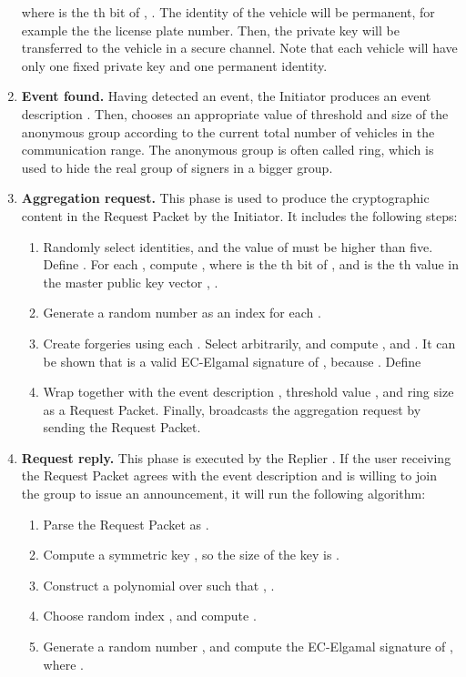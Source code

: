 \documentclass[a4paper]{article}
\begin{document}
\begin{enumerate}
     where  is the th bit of , . The identity of the vehicle will be permanent, for example the the license plate number. Then, the private key will be transferred to the vehicle in a secure channel. Note that each vehicle will have only one fixed private key and one permanent identity.
 \item \textbf{Event found.} Having detected an event, the Initiator  produces an event description . Then,  chooses an appropriate value of threshold  and size of the anonymous group  according to the current total number of vehicles in the communication range. The anonymous group is often called ring, which is used to hide the real group of signers in a bigger group.
 \item \textbf{Aggregation request.} This phase is used to produce the cryptographic content in the Request Packet by the Initiator. It includes the following steps:
        \begin{enumerate}
        \item Randomly select  identities, and the value of  must be higher than five. Define . For each , compute , where  is the th bit of , and  is the th value in the master public key vector , .
        \item Generate a random number  as an index for each .
        \item Create forgeries using each . Select  arbitrarily, and compute , and . It can be shown that  is a valid EC-Elgamal signature of , because . Define 
        \item Wrap  together with the event description , threshold value , and ring size  as a Request Packet. Finally,  broadcasts the aggregation request by sending the Request Packet.
        \end{enumerate}
 \item \textbf{Request reply.} This phase is executed by the Replier . If the user receiving the Request Packet agrees with the event description and is willing to join the group to issue an announcement, it will run the following algorithm:
        \begin{enumerate}
        \item Parse the Request Packet as .
        \item Compute a symmetric key , so the size of the key  is .
        \item Construct a polynomial  over  such that , .
        \item Choose random index , and compute .
        \item Generate a random number , and compute the EC-Elgamal signature  of , where .

\end{enumerate}
\end{enumerate}
\end{document}

